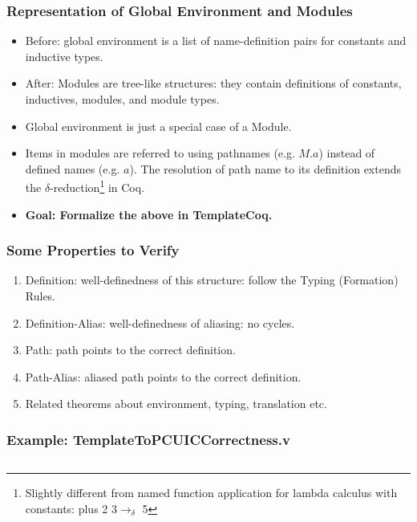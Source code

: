\begin{frame}
    \frametitle{Representation of Global Environment and Modules}
    \begin{itemize}
    \item Before: global environment is a list of name-definition pairs for 
        constants and inductive types.\pause
    \item After: Modules are tree-like structures: they contain definitions of
    constants, inductives, modules, and module types. \pause
    \item Global environment is just a special case of a Module.
    \item Items in modules are referred to using pathnames (e.g. $M.a$)
    instead of defined names (e.g. $a$). The resolution of path name to its definition
    extends the $\delta$-reduction\footnote{Slightly different from named function
    application for lambda calculus with constants: plus 2 3$\to_\delta$ 5} in Coq.
    \item \textbf{Goal: Formalize the above in TemplateCoq.}
    \end{itemize}
\end{frame}

\begin{frame}
    \frametitle{Some Properties to Verify}
    \begin{enumerate}
    \item Definition: well-definedness of this structure: follow the Typing
    (Formation) Rules.
    \item Definition-Alias: well-definedness of aliasing: no cycles.
    \item Path: path points to the correct definition.
    \item Path-Alias: aliased path points to the correct definition.
    \item Related theorems about environment, typing, translation etc.

    \end{enumerate}
\end{frame}

\begin{frame}
    \frametitle{Example: TemplateToPCUICCorrectness.v}
    \inputminted{coq}{code/lemma.v}
\end{frame}
